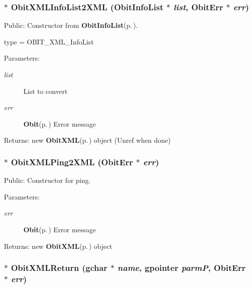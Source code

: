 \subsubsection{$\ast$ Obit\-XMLInfo\-List2XML ({\bf Obit\-Info\-List} $\ast$ {\em list}, {\bf Obit\-Err} $\ast$ {\em err})}\label{ObitXML_8h_a23}


Public: Constructor from {\bf Obit\-Info\-List}{\rm (p.\,\pageref{structObitInfoList})}. 

type = OBIT\_\-XML\_\-Info\-List \begin{Desc}
\item[Parameters:]
\begin{description}
\item[{\em list}]List to convert \item[{\em err}]{\bf Obit}{\rm (p.\,\pageref{structObit})} Error message \end{description}
\end{Desc}
\begin{Desc}
\item[Returns:]new {\bf Obit\-XML}{\rm (p.\,\pageref{structObitXML})} object (Unref when done) \end{Desc}
\subsubsection{$\ast$ Obit\-XMLPing2XML ({\bf Obit\-Err} $\ast$ {\em err})}\label{ObitXML_8h_a21}


Public: Constructor for ping. 

\begin{Desc}
\item[Parameters:]
\begin{description}
\item[{\em err}]{\bf Obit}{\rm (p.\,\pageref{structObit})} Error message \end{description}
\end{Desc}
\begin{Desc}
\item[Returns:]new {\bf Obit\-XML}{\rm (p.\,\pageref{structObitXML})} object \end{Desc}
\subsubsection{$\ast$ Obit\-XMLReturn (gchar $\ast$ {\em name}, gpointer {\em parm\-P}, {\bf Obit\-Err} $\ast$ {\em err})}\label{ObitXML_8h_a32}


